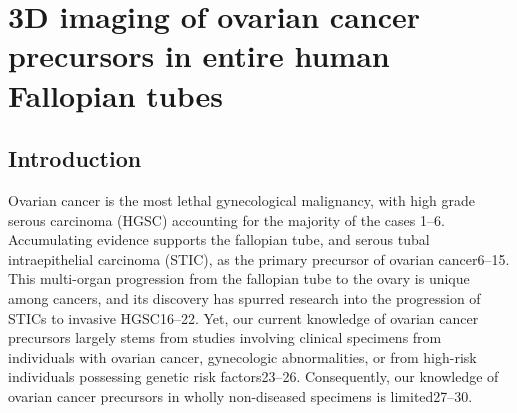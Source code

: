 \chapter{3D imaging of ovarian cancer precursors in entire human Fallopian tubes} \label{chap:chap-3}
\begin{refsection}
    
    
    \section{Introduction}
    Ovarian cancer is the most lethal gynecological malignancy, with high grade serous carcinoma (HGSC) accounting for the majority of the cases \cite{Bowtell2015Rethinking,Kurman2016Dualistic}1–6. Accumulating evidence supports the fallopian tube, and serous tubal intraepithelial carcinoma (STIC), as the primary precursor of ovarian cancer6–15. This multi-organ progression from the fallopian tube to the ovary is unique among cancers, and its discovery has spurred research into the progression of STICs to invasive HGSC16–22. Yet, our current knowledge of ovarian cancer precursors largely stems from studies involving clinical specimens from individuals with ovarian cancer, gynecologic abnormalities, or from high-risk individuals possessing genetic risk factors23–26. Consequently, our knowledge of ovarian cancer precursors in wholly non-diseased specimens is limited27–30.

\end{refsection}
